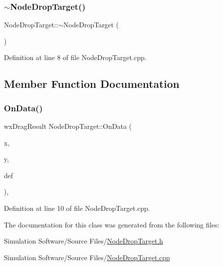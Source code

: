 \subsubsection{\texorpdfstring{$\sim$\+Node\+Drop\+Target()}{~NodeDropTarget()}}
{\footnotesize\ttfamily Node\+Drop\+Target\+::$\sim$\+Node\+Drop\+Target (\begin{DoxyParamCaption}{ }\end{DoxyParamCaption})}



Definition at line 8 of file Node\+Drop\+Target.\+cpp.



\subsection{Member Function Documentation}
\mbox{\label{class_node_drop_target_ab52b10fa0071d44934a56d4f6031bfdf}} 
\subsubsection{\texorpdfstring{On\+Data()}{OnData()}}
{\footnotesize\ttfamily wx\+Drag\+Result Node\+Drop\+Target\+::\+On\+Data (\begin{DoxyParamCaption}\item[{wx\+Coord}]{x,  }\item[{wx\+Coord}]{y,  }\item[{wx\+Drag\+Result}]{def }\end{DoxyParamCaption})\hspace{0.3cm}{\ttfamily [override]}, {\ttfamily [virtual]}}



Definition at line 10 of file Node\+Drop\+Target.\+cpp.



The documentation for this class was generated from the following files\+:\begin{DoxyCompactItemize}
\item 
Simulation Software/\+Source Files/\hyperlink{_node_drop_target_8h}{Node\+Drop\+Target.\+h}\item 
Simulation Software/\+Source Files/\hyperlink{_node_drop_target_8cpp}{Node\+Drop\+Target.\+cpp}\end{DoxyCompactItemize}
